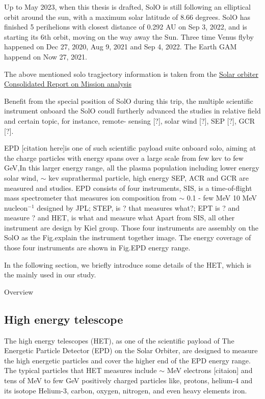 Up to May 2023, when this thesis is drafted, \ac{SolO} is still following an elliptical orbit around the sun, with a maximum solar latitude of 8.66 degrees. \ac{SolO} has finished 5 perihelions with closest distance of 0.292 AU on Sep 3, 2022, and is starting its 6th orbit, moving on the way away the Sun. Three time Venus flyby happened on Dec 27, 2020,  Aug 9, 2021 and Sep 4, 2022. The Earth GAM happend on Now 27, 2021.

The above mentioned solo tragjectory information is taken from the \hyperlink{https://issues.cosmos.esa.int/solarorbiterwiki/display/SOSP/Trajectory+Overview+-+10+February+2020+Launch}{Solar orbiter Consolidated Report on Mission analysis}

Benefit from the special position of \ac{SolO} during this trip, the multiple scientific instrument onboard the \ac{SolO} coudl furtherly advanced the studies  in relative field and certain topic, for instance, remote- sensing [?], solar wind [?], SEP [?], GCR [?].

EPD [citation here]is one of such scientific payload suite onboard solo, aiming at the charge particles with energy spans over a large scale from few kev to few GeV,In this larger energy range, all the plasma population including lower energy solar wind,  $\sim$ kev suprathermal particle, high energy SEP, ACR and GCR are measured and studies.
EPD consists of four instruments, \ac{SIS}, is a time-of-flight mass spectrometer that measures ion composition from  $\sim$ 0.1 - few MeV
10 MeV nucleon$^{-1}$ designed by JPL; \ac{STEP}, is ? that measures what?;  \ac{EPT} is ? and measure ? and \ac{HET}, is what and measure what
Apart from SIS, all other instrument are design by Kiel group.
Those four instruments are assembly on the SolO as the Fig.{}explain the instrument together image. The energy coverage of those four instruments are shown in Fig.{EPD energy range}.

In the following section, we briefly introduce some details of the \ac{HET}, which is the mainly used in our study.

Overview
\subsection{High energy telescope}

The high energy telescopes (HET), as one of the scientific payload of The Energetic Particle Detector (EPD) \cite{EPD_instrument} on the Solar Orbiter, are designed to measure the high energetic particles and cover the higher end of the EPD energy range. The typical particles that HET measures include $\sim$ MeV electrons [citaion] and tens of MeV to few GeV positively charged particles like, protons, helium-4 and its isotope Helium-3, carbon, oxygen, nitrogen, and even heavy elements iron. 

